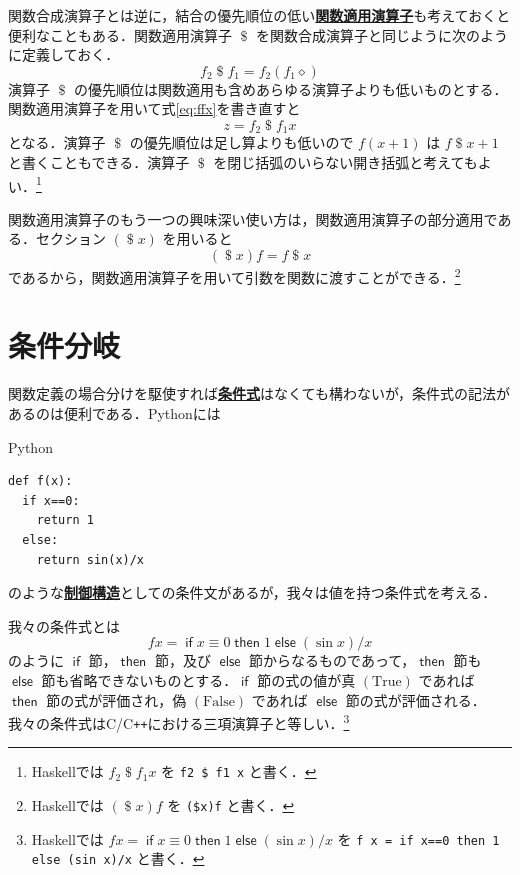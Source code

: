 \documentclass[a4paper,twocolumn]{jsbook}
\newcommand{\programminglanguage}[1]{\textsf{#1}}
\newcommand{\clang}{\programminglanguage{C}}
\newcommand{\cxx}{\programminglanguage{C}\texttt{++}}
\newcommand{\haskell}{\programminglanguage{Haskell}}
\newcommand{\python}{\programminglanguage{Python}}
\newcommand{\keyword}[1]{{\underline{\textbf{#1}}}}
\newcommand{\code}[1]{\texttt{#1}}
\newenvironment{pythoncode}{\begin{itembox}[r]{\python}}{\end{itembox}}
\newcommand{\mKeyword}[1]{\mathsf{#1}} %
\newcommand{\mIfKeyword}{\mKeyword{if}}
\newcommand{\mElseKeyword}{\mKeyword{else}}
\newcommand{\mThenKeyword}{\mKeyword{then}}
\DeclareMathOperator{\mElse}{\mElseKeyword}
\DeclareMathOperator{\mIf}{\mIfKeyword}
\DeclareMathOperator{\mThen}{\mThenKeyword}
\newcommand{\mSpecialConst}[1]{\mathrm{#1}} %
\newcommand{\mFalse}{\mSpecialConst{False}}
\newcommand{\mTrue}{\mSpecialConst{True}}
\newcommand{\mAnonParam}{\diamond}
\DeclareMathOperator{\mApply}{\$}
\newcommand{\mIfThenElse}[3]{\mIf{#1}\mThen{#2}\mElse{#3}}
\begin{document}
関数合成演算子とは逆に，結合の優先順位の低い\keyword{関数適用演算子}も考えておくと便利なこともある．関数適用演算子 $\mApply$ を関数合成演算子と同じように次のように定義しておく．
\begin{equation}
f_2\mApply f_1=f_2\left(f_1\mAnonParam\right)
\end{equation}
演算子 $\mApply$ の優先順位は関数適用も含めあらゆる演算子よりも低いものとする．関数適用演算子を用いて式\eqref{eq:ffx}を書き直すと
\begin{equation}
z=f_2\mApply f_1x
\end{equation}
となる．演算子 $\mApply$ の優先順位は足し算よりも低いので $f(x+1)$ は $f\mApply x+1$ と書くこともできる．演算子 $\mApply$ を閉じ括弧のいらない開き括弧と考えてもよい．\footnote{\haskell では $f_2\mApply f_1x$ を \code{f2 \$ f1 x} と書く．}

関数適用演算子のもう一つの興味深い使い方は，関数適用演算子の部分適用である．セクション $(\mApply x)$ を用いると
\begin{equation}
(\mApply x)f=f\mApply x
\end{equation}
であるから，関数適用演算子を用いて引数を関数に渡すことができる．\footnote{\haskell では $(\mApply x)f$ を \code{(\$x)f} と書く．}

\section{条件分岐}
\label{sec:if}

関数定義の場合分けを駆使すれば\keyword{条件式}はなくても構わないが，条件式の記法があるのは便利である．\python には
\begin{pythoncode}
\begin{verbatim}
def f(x):
  if x==0:
    return 1
  else:
    return sin(x)/x
\end{verbatim}
\end{pythoncode}
のような\keyword{制御構造}としての条件文があるが，我々は値を持つ条件式を考える．

我々の条件式とは
\begin{equation}
fx
=\mIfThenElse{x\equiv0}{1}{{}(\sin x)/x}
\end{equation}
のように $\mIf$ 節，$\mThen$ 節，及び $\mElse$ 節からなるものであって，$\mThen$ 節も $\mElse$ 節も省略できないものとする．$\mIf$ 節の式の値が真 $(\mTrue)$ であれば $\mThen$ 節の式が評価され，偽 $(\mFalse)$ であれば $\mElse$ 節の式が評価される．我々の条件式は\clang/\cxx における三項演算子と等しい．\footnote{\haskell では $fx=\mIfThenElse{x\equiv0}{1}{{}(\sin x)/x}$ を \code{f x = if x==0 then 1 else (sin x)/x} と書く．}
\end{document}
